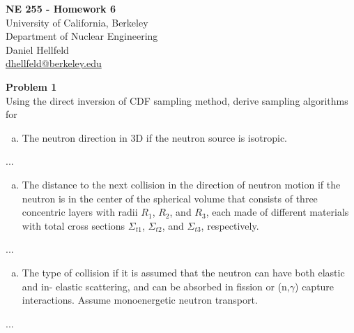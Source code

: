 \documentclass[10pt]{article}
\begin{document}
\begin{centering}
\textbf{\large NE 255 - Homework 6}\\
\vspace{10pt}
University of California, Berkeley\\
Department of Nuclear Engineering\\
\vspace{10pt}
Daniel Hellfeld\\
\href{mailto:dhellfeld@berkeley.edu}{dhellfeld@berkeley.edu}\\
\end{centering}






\vspace{20pt}
\noindent \textbf{Problem 1}\\
Using the direct inversion of CDF sampling method, derive sampling algorithms for

\begin{enumerate}[(a)]
	\item The neutron direction in 3D if the neutron source is isotropic.
\end{enumerate}

...

%
%
%

\begin{enumerate}[(b)]
	\item The distance to the next collision in the direction of neutron motion if the neutron is in the center of the spherical volume that consists of three concentric layers with radii $R_1$, $R_2$, and $R_3$, each made of different materials with total cross sections $\Sigma_{t1}$, $\Sigma_{t2}$, and $\Sigma_{t3}$, respectively.
\end{enumerate}

...

%
%
%

\begin{enumerate}[(c)]
	\item The type of collision if it is assumed that the neutron can have both elastic and in- elastic scattering, and can be absorbed in fission or (n,$\gamma$) capture interactions. Assume monoenergetic neutron transport.
\end{enumerate}

...
\end{document}
